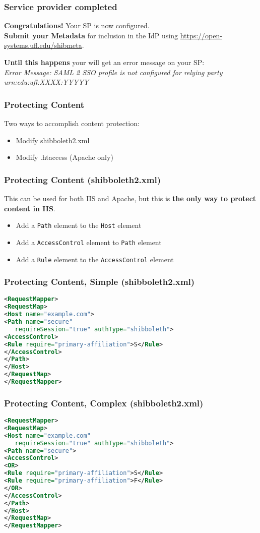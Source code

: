 \begin{frame}
\frametitle{Service provider completed}
{\large \textbf{Congratulations!} Your SP is now configured.} \\
\bigskip
\textbf{Submit your Metadata} for inclusion in the IdP using \url{https://open-systems.ufl.edu/shibmeta}.

\bigskip \bigskip
\textbf{Until this happens} your will get an error message on your SP: \\ \bigskip
\textit{Error Message: SAML 2 SSO profile is not configured for relying party urn:edu:ufl:XXXX:YYYYY}
\end{frame}

\begin{frame}
\frametitle{Protecting Content}
Two ways to accomplish content protection:
\begin{itemize}
\item Modify shibboleth2.xml
\item Modify .htaccess (Apache only)
\end{itemize}
\end{frame}

\begin{frame}
\frametitle{Protecting Content (shibboleth2.xml)}
This can be used for both IIS and Apache, but this is \textbf{the only way to protect content in IIS}.
\begin{itemize}
\item Add a \texttt{Path} element to the \texttt{Host} element 
\item Add a \texttt{AccessControl} element to \texttt{Path} element
\item Add a \texttt{Rule} element to the \texttt{AccessControl} element
\end{itemize}
\end{frame}

\begin{frame}[fragile]
\frametitle{Protecting Content, Simple (shibboleth2.xml)}
\begin{lstlisting}[language=XML,basicstyle=\ttfamily \small]
<RequestMapper>
<RequestMap>
<Host name="example.com">
<Path name="secure" 
   requireSession="true" authType="shibboleth">
<AccessControl>
<Rule require="primary-affiliation">S</Rule>
</AccessControl>
</Path>
</Host>
</RequestMap>
</RequestMapper>
\end{lstlisting}

\end{frame}

\begin{frame}[fragile]
\frametitle{Protecting Content, Complex (shibboleth2.xml)}
\begin{lstlisting}[language=XML,basicstyle=\ttfamily \small]
<RequestMapper>
<RequestMap>
<Host name="example.com" 
   requireSession="true" authType="shibboleth">
<Path name="secure">
<AccessControl>
<OR>
<Rule require="primary-affiliation">S</Rule>
<Rule require="primary-affiliation">F</Rule>
</OR>
</AccessControl>
</Path>
</Host>
</RequestMap>
</RequestMapper>
\end{lstlisting}

\end{frame}

